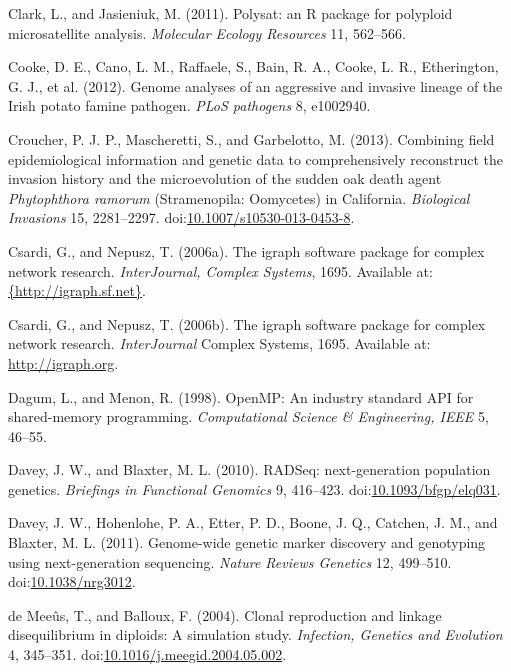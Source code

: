 \documentclass[double,12pt]{beavtex}
\begin{document}
  \hypertarget{ref-polysat}{}
  Clark, L., and Jasieniuk, M. (2011). Polysat: an R package for polyploid
  microsatellite analysis. \emph{Molecular Ecology Resources} 11,
  562--566.
  
  \hypertarget{ref-cooke2012genome}{}
  Cooke, D. E., Cano, L. M., Raffaele, S., Bain, R. A., Cooke, L. R.,
  Etherington, G. J., et al. (2012). Genome analyses of an aggressive and
  invasive lineage of the Irish potato famine pathogen. \emph{PLoS
  pathogens} 8, e1002940.
  
  \hypertarget{ref-croucher2013combining}{}
  Croucher, P. J. P., Mascheretti, S., and Garbelotto, M. (2013).
  Combining field epidemiological information and genetic data to
  comprehensively reconstruct the invasion history and the microevolution
  of the sudden oak death agent \emph{Phytophthora ramorum} (Stramenopila:
  Oomycetes) in California. \emph{Biological Invasions} 15, 2281--2297.
  doi:\href{https://doi.org/10.1007/s10530-013-0453-8}{10.1007/s10530-013-0453-8}.
  
  \hypertarget{ref-igraph}{}
  Csardi, G., and Nepusz, T. (2006a). The igraph software package for
  complex network research. \emph{InterJournal, Complex Systems}, 1695.
  Available at:
  \href{\%7Bhttp://igraph.sf.net\%7D}{\{http://igraph.sf.net\}}.
  
  \hypertarget{ref-csardi2006igraph}{}
  Csardi, G., and Nepusz, T. (2006b). The igraph software package for
  complex network research. \emph{InterJournal} Complex Systems, 1695.
  Available at: \url{http://igraph.org}.
  
  \hypertarget{ref-dagum1998openmp}{}
  Dagum, L., and Menon, R. (1998). OpenMP: An industry standard API for
  shared-memory programming. \emph{Computational Science \& Engineering,
  IEEE} 5, 46--55.
  
  \hypertarget{ref-davey2010rad}{}
  Davey, J. W., and Blaxter, M. L. (2010). RADSeq: next-generation
  population genetics. \emph{Briefings in Functional Genomics} 9,
  416--423.
  doi:\href{https://doi.org/10.1093/bfgp/elq031}{10.1093/bfgp/elq031}.
  
  \hypertarget{ref-davey2011genome}{}
  Davey, J. W., Hohenlohe, P. A., Etter, P. D., Boone, J. Q., Catchen, J.
  M., and Blaxter, M. L. (2011). Genome-wide genetic marker discovery and
  genotyping using next-generation sequencing. \emph{Nature Reviews
  Genetics} 12, 499--510.
  doi:\href{https://doi.org/10.1038/nrg3012}{10.1038/nrg3012}.
  
  \hypertarget{ref-de2004clonal}{}
  de Meeûs, T., and Balloux, F. (2004). Clonal reproduction and linkage
  disequilibrium in diploids: A simulation study. \emph{Infection,
  Genetics and Evolution} 4, 345--351.
  doi:\href{https://doi.org/10.1016/j.meegid.2004.05.002}{10.1016/j.meegid.2004.05.002}.
  
\end{document}
